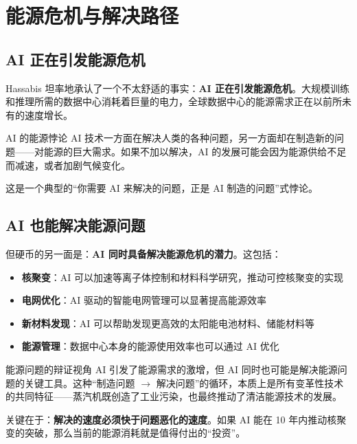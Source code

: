 \documentclass[a4paper]{article}
\begin{document}
\section{能源危机与解决路径}

\subsection{AI 正在引发能源危机}

Hassabis 坦率地承认了一个不太舒适的事实：\textbf{AI 正在引发能源危机}。大规模训练和推理所需的数据中心消耗着巨量的电力，全球数据中心的能源需求正在以前所未有的速度增长。

\begin{warningbox}{AI 的能源悖论}
AI 技术一方面在解决人类的各种问题，另一方面却在制造新的问题——对能源的巨大需求。如果不加以解决，AI 的发展可能会因为能源供给不足而减速，或者加剧气候变化。

这是一个典型的``你需要 AI 来解决的问题，正是 AI 制造的问题''式悖论。
\end{warningbox}

\subsection{AI 也能解决能源问题}

但硬币的另一面是：\textbf{AI 同时具备解决能源危机的潜力}。这包括：

\begin{itemize}
    \item \textbf{核聚变}：AI 可以加速等离子体控制和材料科学研究，推动可控核聚变的实现
    \item \textbf{电网优化}：AI 驱动的智能电网管理可以显著提高能源效率
    \item \textbf{新材料发现}：AI 可以帮助发现更高效的太阳能电池材料、储能材料等
    \item \textbf{能源管理}：数据中心本身的能源使用效率也可以通过 AI 优化
\end{itemize}

\begin{importantbox}{能源问题的辩证视角}
AI 引发了能源需求的激增，但 AI 同时也可能是解决能源问题的关键工具。这种``制造问题 $\to$ 解决问题''的循环，本质上是所有变革性技术的共同特征——蒸汽机既创造了工业污染，也最终推动了清洁能源技术的发展。

关键在于：\textbf{解决的速度必须快于问题恶化的速度}。如果 AI 能在 10 年内推动核聚变的突破，那么当前的能源消耗就是值得付出的``投资''。
\end{importantbox}
\end{document}
